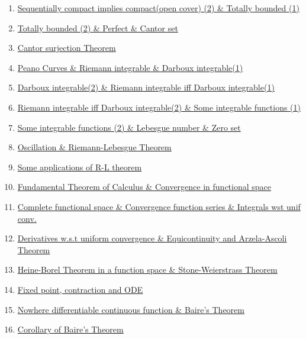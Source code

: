 \documentclass[11pt]{article}
\begin{document}
\begin{enumerate}
	\item 	\href{https://mp.weixin.qq.com/s/lCXe3Ra_E7_WUYN7m_E-cw}{Sequentially compact implies compact(open cover) (2) \& Totally bounded (1)}	%
	\item 	\href{https://mp.weixin.qq.com/s/-KG6ZBaSu08D9_zx9K02dQ}{Totally bounded (2) \& Perfect \& Cantor set}	%
	\item 	\href{https://mp.weixin.qq.com/s/PUb16hKtrIQWF25eElY7kA}{Cantor surjection Theorem}	%
	\item 	\href{https://mp.weixin.qq.com/s/tmhCsB-kJ4BPKmPREeIaBw}{Peano Curves \& Riemann integrable \& Darboux integrable(1)}	%
	\item 	\href{https://mp.weixin.qq.com/s/147QppZMOXzIhNVcEtfTIg}{Darboux integrable(2) \& Riemann integrable iff Darboux integrable(1)}	%
	\item 	\href{https://mp.weixin.qq.com/s/M_-st-WoKh4soOjIXX5g0Q}{Riemann integrable iff Darboux integrable(2) \& Some integrable functions (1)}	%
	\item 	\href{https://mp.weixin.qq.com/s/Jt7X7XkeQ4SZmLt3Xz-cSQ}{Some integrable functions (2) \& Lebesgue number \& Zero set}	%
	\item	\href{https://mp.weixin.qq.com/s/px5q4TwGmqg4dugKperRUg}{Oscillation \& Riemann-Lebesgue Theorem}	%
	\item	\href{https://mp.weixin.qq.com/s/L09Z6ol8pDlXTU3nhWA9xg}{Some applications of R-L theorem}	%
	\item	\href{https://mp.weixin.qq.com/s/7FH61HZZ4lOGuwhQW4YKCw}{Fundamental Theorem of Calculus \& Convergence in functional space} 	%
	\item 	\href{https://mp.weixin.qq.com/s/-S4cIef_jiF4aM3LX7VcJQ}{Complete functional space \& Convergence function series \& Integrals wst unif conv.}	%
	\item 	\href{https://mp.weixin.qq.com/s/qyGJIhlP9Aqwf6GvGjSN8g}{Derivatives w.s.t uniform convergence \& Equicontinuity and Arzela-Ascoli Theorem}	%
	\item 	\href{https://mp.weixin.qq.com/s/iOiftePQi0OuShi7f8pDDA}{Heine-Borel Theorem in a function space \& Stone-Weierstrass Theorem}	%
	\item 	\href{https://mp.weixin.qq.com/s/wrnH0EfvWdpe147qNfj3Kw}{Fixed point, contraction and ODE}	%
	\item 	\href{https://mp.weixin.qq.com/s/Qn99qwTaHMuQuVMiYyf0CQ}{Nowhere differentiable continuous function \& Baire’s Theorem}	%
	\item 	\href{https://mp.weixin.qq.com/s/iwcOC0OTkTHJwLHr6brCrQ}{Corollary of Baire’s Theorem}	%

\end{enumerate}
\end{document}
